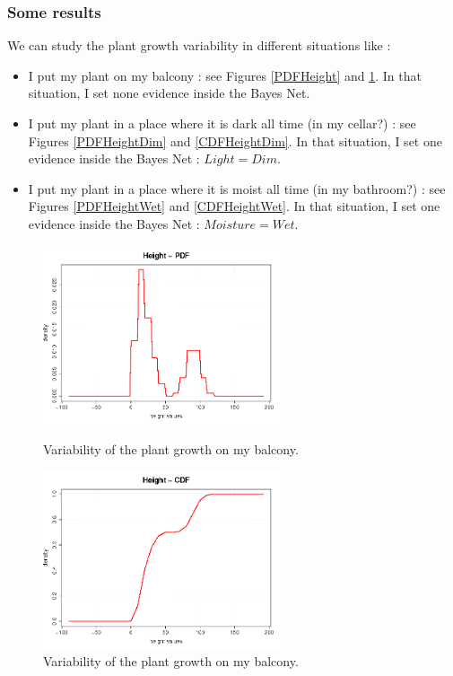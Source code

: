 \subsubsection{Some results}

We can study the plant growth variability in different situations like  : 
\begin{itemize}
   \item  I put my plant on my balcony : see Figures \ref{PDFHeight} and \ref{CDFHeight}. In that situation, I set none evidence inside the Bayes Net.
   \item  I put my plant in a  place where it is dark all time (in my cellar?) : see Figures \ref{PDFHeightDim} and \ref{CDFHeightDim}. In that situation, I set one evidence inside the Bayes Net : $Light=Dim$.
   \item  I put my plant in a  place where it is moist all time (in my bathroom?) : see Figures \ref{PDFHeightWet} and \ref{CDFHeightWet}. In that situation, I set one evidence inside the Bayes Net : $Moisture=Wet$.
\end{itemize}




\begin{figure}[H]
  \begin{minipage}{10cm}
    \begin{center}
      \includegraphics[width=7cm]{Height_PDF.png}
      \caption{Variability of the plant growth on my balcony.}
      \label{PDFHeight}
    \end{center}
  \end{minipage}
  \hfill
  \begin{minipage}{10cm}
    \begin{center}
      \includegraphics[width=7cm]{Height_CDF.png}
      \caption{Variability of the plant growth on my balcony.}
      \label{CDFHeight}
    \end{center}
  \end{minipage}
\end{figure}



